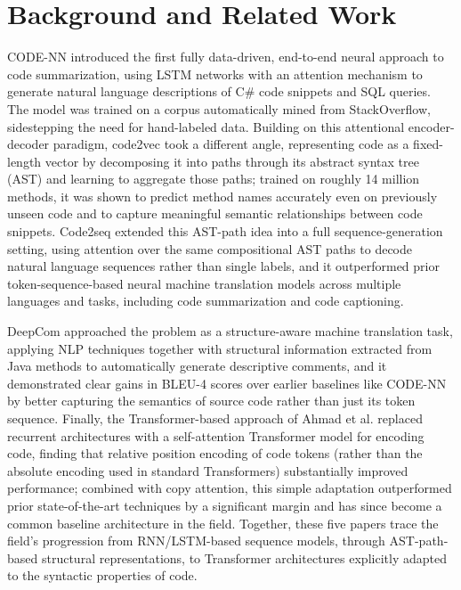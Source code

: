 \section{Background and Related Work}

CODE-NN \cite{iyer2016} introduced the first fully data-driven, end-to-end neural approach to code summarization, using LSTM networks with an attention mechanism to generate natural language descriptions of C\# code snippets and SQL queries. The model was trained on a corpus automatically mined from StackOverflow, sidestepping the need for hand-labeled data. Building on this attentional encoder-decoder paradigm, code2vec \cite{alon2018} took a different angle, representing code as a fixed-length vector by decomposing it into paths through its abstract syntax tree (AST) and learning to aggregate those paths; trained on roughly 14 million methods, it was shown to predict method names accurately even on previously unseen code and to capture meaningful semantic relationships between code snippets. Code2seq \cite{Alon2018code2seqGS} extended this AST-path idea into a full sequence-generation setting, using attention over the same compositional AST paths to decode natural language sequences rather than single labels, and it outperformed prior token-sequence-based neural machine translation models across multiple languages and tasks, including code summarization and code captioning.

DeepCom \cite{hu2018} approached the problem as a structure-aware machine translation task, applying NLP techniques together with structural information extracted from Java methods to automatically generate descriptive comments, and it demonstrated clear gains in BLEU-4 scores over earlier baselines like CODE-NN by better capturing the semantics of source code rather than just its token sequence. Finally, the Transformer-based approach of Ahmad et al. \cite{ahmad2020transformerbasedapproachsourcecode} replaced recurrent architectures with a self-attention Transformer model for encoding code, finding that relative position encoding of code tokens (rather than the absolute encoding used in standard Transformers) substantially improved performance; combined with copy attention, this simple adaptation outperformed prior state-of-the-art techniques by a significant margin and has since become a common baseline architecture in the field. Together, these five papers trace the field's progression from RNN/LSTM-based sequence models, through AST-path-based structural representations, to Transformer architectures explicitly adapted to the syntactic properties of code.

